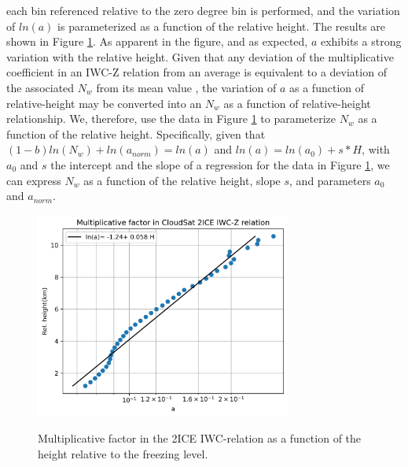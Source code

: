 \documentclass{ametsocV6.1}
\begin{document}
each bin referenced relative to the zero degree bin is performed, and the variation of $ln(a)$ is parameterized as a function of the
relative height.  The results are shown in Figure \ref{f2}. As apparent in the figure, and as expected, $a$ exhibits a strong variation 
with the relative height. Given that any deviation of the multiplicative coefficient in 
an IWC-Z relation from an average is equivalent to a deviation of the associated $N_w$ from its mean value 
\citep{ferreira2001,delanoe2014}, the variation of $a$ as a function of relative-height may be converted into an $N_w$ 
as a function of relative-height relationship.  We, therefore, use the data in Figure \ref{f2} to parameterize $N_w$ as a 
function of the relative height.  Specifically, given that $(1-b)ln(N_w)+ln(a_{norm})=ln(a)$ and $ln(a)=ln(a_0)+s*H$, with 
$a_0$ and $s$ the intercept and the slope of a regression for the data in Figure \ref{f2}, we 
can express $N_w$ as a function of the relative height, slope $s$, and parameters $a_0$ and $a_{norm}$.

\begin{figure}[t]
    \centering
    \includegraphics[width=0.75\textwidth,angle=0]{./Figs/fig02.rev.png}\\
    \caption{Multiplicative factor in the 2ICE IWC-relation as a function of the height relative to the freezing level.}\label{f2}
\end{figure}
\end{document}
